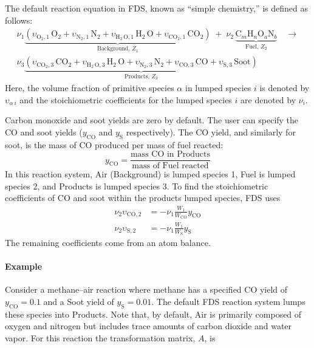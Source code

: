 The default reaction equation in FDS, known as ``simple chemistry,'' is defined as follows:
\begin{multline}\label{eq:full_lump}
\nu_{1}\underbrace{(\upsilon_{\mathrm{O}_{2},1} \, \mathrm{O}_2 +\upsilon_{\mathrm{N}_{2},1} \, \mathrm{N}_2 + \upsilon_{\mathrm{H}_{2} \, \mathrm{O},1} \, \mathrm{H}_2 \, \mathrm{O}+\upsilon_{\mathrm{CO}_{2},1} \, \mathrm{CO}_2)}_\text{Background,~$Z_1$} \; + \; \nu_{2} \, \underbrace{\mbox{C}_m\mbox{H}_n\mbox{O}_a\mbox{N}_b}_\text{Fuel,~$Z_2$} \quad \longrightarrow \\
\nu_{3}\underbrace{(\upsilon_{\mathrm{CO}_{2},3} \, \mathrm{CO}_2 + \upsilon_{\mathrm{H}_{2} \, \mathrm{O},3} \, \mathrm{H}_2 \, \mathrm{O} + \upsilon_{\mathrm{N}_{2},3} \, \mathrm{N}_2+\upsilon_{\mathrm{CO},3} \, \mathrm{CO} + \upsilon_{\mathrm{S},3} \, \mathrm{Soot})}_\text{Products,~$Z_3$}
\end{multline}
Here, the volume fraction of primitive species $\alpha$ in lumped species $i$ is denoted by $\upsilon_{\alpha\,i}$ and the stoichiometric coefficients for the lumped species $i$ are denoted by $\nu_{i}$.

Carbon monoxide and soot yields are zero by default. The user can specify the CO and soot yields ($y_{\mathrm{CO}}$ and $y_{\mathrm{S}}$ respectively). The CO yield, and similarly for soot, is the mass of CO produced per mass of fuel reacted:
\begin{equation}\label{eq:y_co}
y_\mathrm{CO} = \frac{\mbox{mass CO in Products}}{\mbox{mass of Fuel reacted}}
\end{equation}
In this reaction system, Air (Background) is lumped species 1, Fuel is lumped species 2, and Products is lumped species 3. To find the stoichiometric coefficients of CO and soot within the products lumped species, FDS uses
\begin{align}\label{eq:yields}
\nu_{2}\upsilon_{\mathrm{CO},2}&=-\nu_{1}\frac{W_1}{W_{\mathrm{CO}}}y_{\mathrm{CO}} \\
\nu_{2}\upsilon_{\mathrm{S},2}&=-\nu_{1}\frac{W_1}{W_{\mathrm{S}}}y_{\mathrm{S}}
\end{align}
The remaining coefficients come from an atom balance.

\paragraph{Example} Consider a methane--air reaction where methane has a specified CO yield of $y_{\mathrm{CO}}=0.1$ and a Soot yield of $y_{\mathrm{S}}=0.01$. The default FDS reaction system lumps these species into Products. Note that, by default, Air is primarily composed of oxygen and nitrogen but includes trace amounts of carbon dioxide and water vapor. For this reaction the transformation matrix, $A$, is

